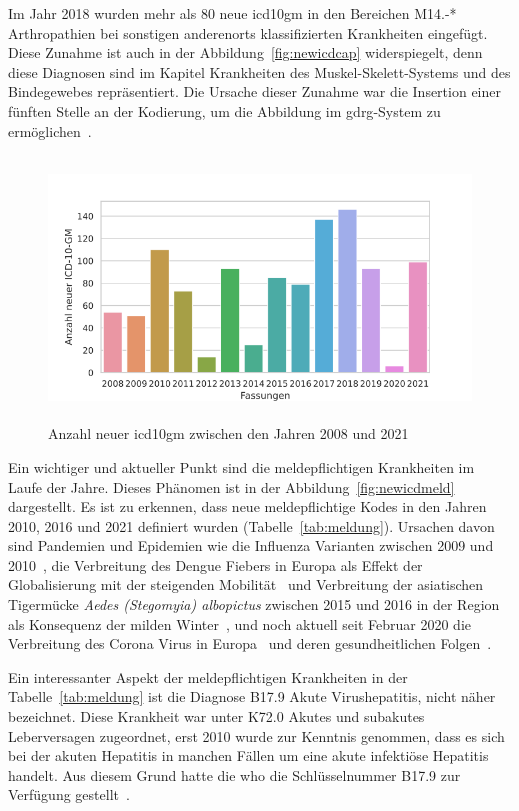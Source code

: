 Im Jahr 2018 wurden mehr als 80 neue \ac{icd10gm} in den Bereichen \textsf{M14.-*} \textsf{Arthropathien bei sonstigen anderenorts klassifizierten Krankheiten} eingefügt. Diese Zunahme ist auch in der Abbildung~\ref{fig:newicdcap} widerspiegelt, denn diese Diagnosen sind im Kapitel \textsf{Krankheiten des Muskel-Skelett-Systems und des Bindegewebes} repräsentiert. Die Ursache dieser Zunahme war die Insertion einer fünften Stelle an der Kodierung, um die Abbildung im \ac{gdrg}-System zu ermöglichen~\cite{musk18}.


\begin{figure}[ht]
	\centering
	\includegraphics[height=7cm]{figures/newicdyear}
	\caption[Neue \acs{icd10gm} pro Jahr]{Anzahl neuer \acs{icd10gm} zwischen den Jahren 2008 und 2021}
	\label{fig:newicdyear}
\end{figure} 

Ein wichtiger und aktueller Punkt sind die meldepflichtigen Krankheiten im Laufe der Jahre. Dieses Phänomen ist in der Abbildung~\ref{fig:newicdmeld} dargestellt. Es ist zu erkennen, dass neue meldepflichtige Kodes in den Jahren 2010, 2016 und 2021 definiert wurden (Tabelle~\ref{tab:meldung}). Ursachen davon sind Pandemien und Epidemien wie die Influenza Varianten zwischen 2009 und 2010~\cite{influenza1, influenza2}, die Verbreitung des Dengue Fiebers in Europa als Effekt der Globalisierung mit der steigenden Mobilität~\cite{denge1} und Verbreitung der asiatischen Tigermücke \textsl{Aedes (Stegomyia) albopictus} zwischen 2015 und 2016 in der Region als Konsequenz der milden Winter~\cite{denge2}, und noch aktuell seit Februar 2020 die Verbreitung des Corona Virus in Europa~\cite{corona1} und deren gesundheitlichen Folgen~\cite{corona2}. 

Ein interessanter Aspekt der meldepflichtigen Krankheiten in der Tabelle~\ref{tab:meldung} ist die Diagnose \textsf{B17.9} \textsf{Akute Virushepatitis, nicht näher bezeichnet}. Diese Krankheit war unter \textsf{K72.0} \textsf{Akutes und subakutes Leberversagen} zugeordnet, erst 2010 wurde zur Kenntnis genommen, dass es sich bei der akuten Hepatitis in manchen Fällen um eine akute infektiöse Hepatitis handelt. Aus diesem Grund hatte die \ac{who} die Schlüsselnummer \textsf{B17.9} zur Verfügung gestellt~\cite{komm10}.

